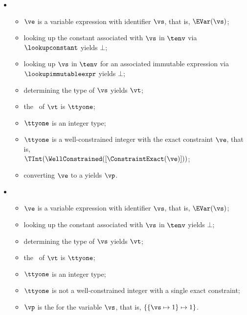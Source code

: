 \begin{itemize}
  \item {}
  \begin{itemize}
    \item $\ve$ is a variable expression with identifier $\vs$, that is, $\EVar(\vs)$;
    \item looking up the constant associated with $\vs$ in $\tenv$ via $\lookupconstant$ yields $\bot$;
    \item looking up $\vs$ in $\tenv$ for an associated immutable expression via \\
          $\lookupimmutableexpr$ yields $\bot$;
    \item determining the type of $\vs$ yields $\vt$\ProseOrTypeError;
    \item the \underlyingtypeterm\ of $\vt$ is $\ttyone$\ProseOrTypeError;
    \item $\ttyone$ is an integer type;
    \item $\ttyone$ is a well-constrained integer with the exact constraint $\ve$, that is, \\ $\TInt(\WellConstrained([\ConstraintExact(\ve)]))$;
    \item converting $\ve$ to a \symbolicexpressionterm{} yields $\vp$\ProseTerminateAs{\CannotBeTransformed}.
  \end{itemize}

  \item {}
  \begin{itemize}
    \item $\ve$ is a variable expression with identifier $\vs$, that is, $\EVar(\vs)$;
    \item looking up the constant associated with $\vs$ in $\tenv$ yields $\bot$;
    \item determining the type of $\vs$ yields $\vt$\ProseOrTypeError;
    \item the \underlyingtypeterm\ of $\vt$ is $\ttyone$\ProseOrTypeError;
    \item $\ttyone$ is an integer type;
    \item $\ttyone$ is not a well-constrained integer with a single exact constraint;
    \item $\vp$ is the \symbolicexpressionterm{} for the variable $\vs$, that is, $\{ \{\vs\mapsto 1\}\mapsto 1 \}$.
  \end{itemize}


\end{itemize}
